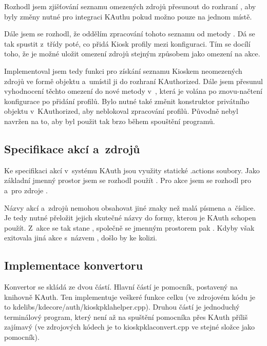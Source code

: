 Rozhodl jsem zjišťování seznamu omezených zdrojů přesunout do rozhraní , aby byly změny nutné pro integraci KAuthu pokud možno pouze na jednom místě.

Dále jsem se rozhodl, že oddělím zpracování tohoto seznamu od metody . Dá se tak spustit z~třídy  poté, co  přidá Kiosk profily mezi konfiguraci. Tím se docílí toho, že je možné uložit omezení zdrojů stejným způsobem jako omezení na akce.

Implementoval jsem tedy funkci  pro získání seznamu Kioskem neomezených zdrojů ve formě objektu  a~umístil ji do rozhraní KAuthorized. Dále jsem přesunul vyhodnocení těchto omezení do nové metody \linebreak{} v~, která je volána po znovu-načtení konfigurace po přidání profilů. Bylo nutné také změnit konstruktor privátního objektu v~KAuthorized, aby neblokoval zpracování profilů. Původně nebyl navržen na to, aby byl použit tak brzo během spouštění programů.

\subsection*{Specifikace akcí a~zdrojů}
Ke specifikaci akcí v~systému KAuth jsou využity statické .actions soubory. Jako základní jmenný prostor jsem se rozhodl použít . Pro akce jsem se rozhodl pro  a~pro zdroje .

Názvy akcí a~zdrojů nemohou obsahovat jiné znaky než malá písmena a~číslice. Je tedy nutné přeložit jejich skutečné názvy do formy, kterou je KAuth schopen použít. Z~akce  se tak stane , společně se jmenným prostorem pak \linebreak{}. Kdyby však exitovala jiná akce s~názvem , došlo by ke kolizi.

\subsection*{Implementace konvertoru}
Konvertor se skládá ze dvou částí. Hlavní částí je pomocník, postavený na knihovně KAuth. Ten implementuje veškeré funkce celku (ve zdrojovém kódu je to kdelibs/kdecore/auth/kioskpklahelper.cpp). Druhou částí je jednoduchý terminálový program, který není až na spuštění pomocníka přes KAuth příliš zajímavý (ve zdrojových kódech je to kioskpklaconvert.cpp ve stejné složce jako pomocník).

